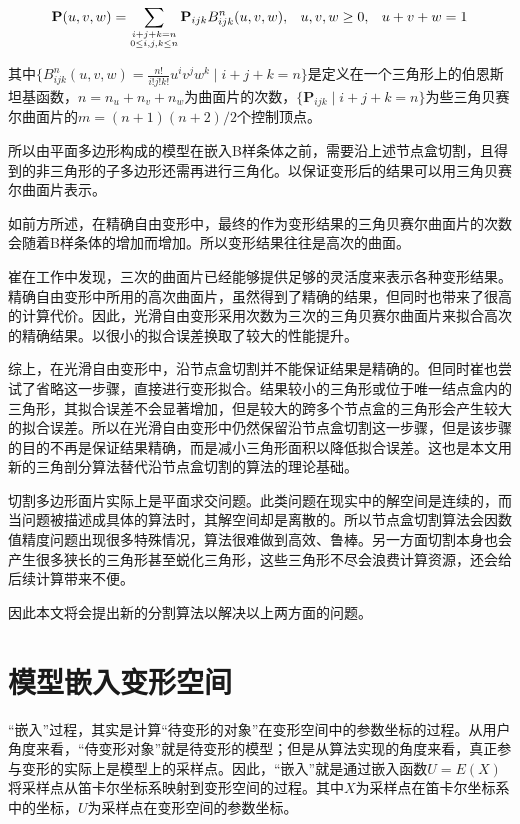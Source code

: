 \begin{equation}
	\footnotesize
	{\mathbf P}(u,v,w)
	= \sum_{\substack{i+j+k=n \\ 0\leq i,j,k\leq n}} {\mathbf P}_{ijk}B^n_{ijk}(u,v,w), \hspace{8 pt} u,v,w\ge0,
		\hspace{8 pt}u+v+w=1
	\label{equ:Puvw}
\end{equation}

其中$\{B_{ijk}^n(u,v,w)=\frac{n!}{i!j!k!}u^iv^jw^k \mid i+j+k=n\}$是定义在一个三角形上的伯恩斯坦基函数，$n=n_u+n_v+n_w$为曲面片的次数，$\{\mathbf P_{ijk} \mid i+j+k=n\}$为些三角贝赛尔曲面片的$m=(n+1)(n+2)/2$个控制顶点。

所以由平面多边形构成的模型在嵌入B样条体之前，需要沿上述节点盒切割，且得到的非三角形的子多边形还需再进行三角化。以保证变形后的结果可以用三角贝赛尔曲面片表示。

如前方所述，在精确自由变形中，最终的作为变形结果的三角贝赛尔曲面片的次数会随着B样条体的增加而增加。所以变形结果往往是高次的曲面。

崔在工作中\cite{Cui15}发现，三次的曲面片已经能够提供足够的灵活度来表示各种变形结果。精确自由变形中所用的高次曲面片，虽然得到了精确的结果，但同时也带来了很高的计算代价。因此，光滑自由变形采用次数为三次的三角贝赛尔曲面片来拟合高次的精确结果。以很小的拟合误差换取了较大的性能提升。

综上，在光滑自由变形中，沿节点盒切割并不能保证结果是精确的。但同时崔也尝试了省略这一步骤，直接进行变形拟合。结果较小的三角形或位于唯一结点盒内的三角形，其拟合误差不会显著增加，但是较大的跨多个节点盒的三角形会产生较大的拟合误差。所以在光滑自由变形中仍然保留沿节点盒切割这一步骤，但是该步骤的目的不再是保证结果精确，而是减小三角形面积以降低拟合误差。这也是本文用新的三角剖分算法替代沿节点盒切割的算法的理论基础。

切割多边形面片实际上是平面求交问题。此类问题在现实中的解空间是连续的，而当问题被描述成具体的算法时，其解空间却是离散的。所以节点盒切割算法会因数值精度问题出现很多特殊情况，算法很难做到高效、鲁棒。另一方面切割本身也会产生很多狭长的三角形甚至蜕化三角形，这些三角形不尽会浪费计算资源，还会给后续计算带来不便。

因此本文将会提出新的分割算法以解决以上两方面的问题。

\section{模型嵌入变形空间}
“嵌入”过程，其实是计算“待变形的对象”在变形空间中的参数坐标的过程。从用户角度来看，“侍变形对象”就是待变形的模型；但是从算法实现的角度来看，真正参与变形的实际上是模型上的采样点。因此，“嵌入”就是通过嵌入函数$U=E(X)$将采样点从笛卡尔坐标系映射到变形空间的过程。其中$X$为采样点在笛卡尔坐标系中的坐标，$U$为采样点在变形空间的参数坐标。

